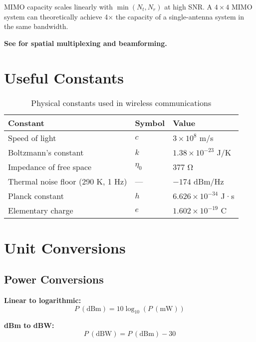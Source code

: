 \begin{keyconcept}
MIMO capacity scales linearly with $\min(N_t, N_r)$ at high SNR. A $4\times4$ MIMO system can theoretically achieve 4× the capacity of a single-antenna system in the same bandwidth.
\end{keyconcept}

\textbf{See  for spatial multiplexing and beamforming.}

\section{Useful Constants}
\label{sec:useful-constants}

\begin{table}[h]
\centering
\begin{tabular}{@{}lll@{}}
\toprule
\textbf{Constant} & \textbf{Symbol} & \textbf{Value} \\
\midrule
Speed of light & $c$ & $3 \times 10^8$ m/s \\
Boltzmann's constant & $k$ & $1.38 \times 10^{-23}$ J/K \\
Impedance of free space & $\eta_0$ & $377$ Ω \\
Thermal noise floor (290 K, 1 Hz) & --- & $-174$ dBm/Hz \\
Planck constant & $h$ & $6.626 \times 10^{-34}$ J·s \\
Elementary charge & $e$ & $1.602 \times 10^{-19}$ C \\
\bottomrule
\end{tabular}
\caption{Physical constants used in wireless communications}
\label{tab:constants}
\end{table}

\section{Unit Conversions}
\label{sec:unit-conversions}

\subsection{Power Conversions}
\label{subsec:power-conversions}

\textbf{Linear to logarithmic:}
\begin{equation}
\label{eq:power-dbm}
P\ (\text{dBm}) = 10\log_{10}(P\ (\text{mW}))
\end{equation}

\textbf{dBm to dBW:}
\begin{equation}
\label{eq:power-dbw}
P\ (\text{dBW}) = P\ (\text{dBm}) - 30
\end{equation}

